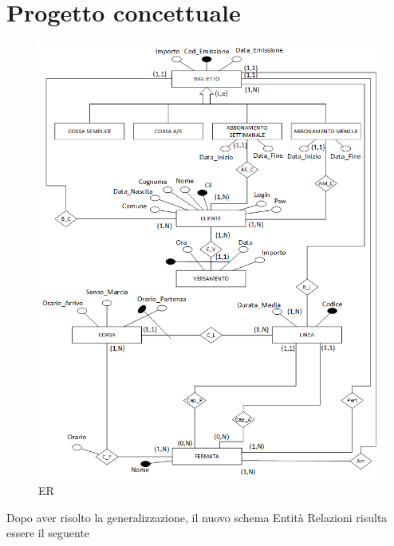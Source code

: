 \documentclass[a4paper,11pt]{book}
\begin{document}
\chapter{Progetto concettuale}
\begin{figure}[!ht]
\centering
\includegraphics[scale = 0.3]{ER.png}
\caption{ER}
\end{figure}

\clearpage
Dopo aver risolto la generalizzazione, il nuovo schema Entità Relazioni risulta essere il seguente
\end{document}

